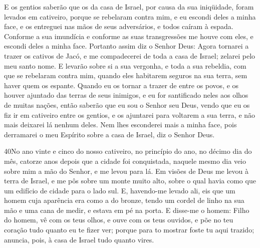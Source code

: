 E os gentios saberão que os da casa de Israel, por causa da sua
iniqüidade, foram levados em cativeiro, porque se rebelaram contra
mim, e eu escondi deles a minha face, e os entreguei nas mãos de
seus adversários, e todos caíram à espada. Conforme a sua
imundícia e conforme as suas transgressões me houve com eles, e
escondi deles a minha face. Portanto assim diz o Senhor Deus:
Agora tornarei a trazer os cativos de Jacó, e me compadecerei de
toda a casa de Israel; zelarei pelo meu santo nome. E levarão
sobre si a sua vergonha, e toda a sua rebeldia, com que se rebelaram
contra mim, quando eles habitarem seguros na sua terra, sem haver
quem os espante. Quando eu os tornar a trazer de entre os
povos, e os houver ajuntado das terras de seus inimigos, e eu for
santificado neles aos olhos de muitas nações, então saberão
que eu sou o Senhor seu Deus, vendo que eu os fiz ir em cativeiro
entre os gentios, e os ajuntarei para voltarem a sua terra, e não
mais deixarei lá nenhum deles. Nem lhes esconderei mais a
minha face, pois derramarei o meu Espírito sobre a casa de Israel,
diz o Senhor Deus.

\medskip

\lettrine{40} No ano vinte e cinco do nosso cativeiro, no
princípio do ano, no décimo dia do mês, catorze anos depois que a
cidade foi conquistada, naquele mesmo dia veio sobre mim a mão do
Senhor, e me levou para lá. Em visões de Deus me levou à terra
de Israel, e me pôs sobre um monte muito alto, sobre o qual havia
como que um edifício de cidade para o lado sul. E, havendo-me
levado ali, eis que um homem cuja aparência era como a do bronze,
tendo um cordel de linho na sua mão e uma cana de medir, e estava em
pé na porta. E disse-me o homem: Filho do homem, vê com os teus
olhos, e ouve com os teus ouvidos, e põe no teu coração tudo quanto
eu te fizer ver; porque para to mostrar foste tu aqui trazido;
anuncia, pois, à casa de Israel tudo quanto vires.

